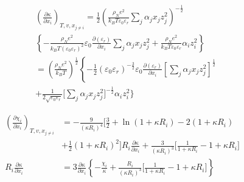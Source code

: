 \documentclass[12pt, letterpaper]{article}
\begin{document}
\begin{equation}
    \begin{aligned}
         & \left(\frac{\partial\kappa}{\partial x_{i}}\right)_{T,v,x_{j\neq i}}=\frac12\left(\frac{\rho_{N}e^{2}}{k_{B}T\varepsilon_{0}\varepsilon_{r}}\sum_{j}\alpha_{j}x_{j}z_{j}^{2}\right)^{-\frac12} \\&\left\{-\frac{\rho_{N}e^2}{k_{B}T\left(\varepsilon_{0}\varepsilon_{r}\right)^2}\varepsilon_{0}\frac{\partial\left(\varepsilon_{r}\right)}{\partial x_{i}}\sum_{j}\alpha_{j}x_{j}z_{j}^2+\frac{\rho_{N}e^2}{k_{B}T\varepsilon_{0}\varepsilon_{r}}\alpha_{i}z_{i}^2\right\}\\&=\left(\frac{\rho_{N}e^{2}}{k_{B}T}\right)^{\frac{1}{2}}\left\{-\frac{1}{2}\left(\varepsilon_{0}\varepsilon_{r}\right)^{-\frac{3}{2}}\varepsilon_{0}\frac{\partial\left(\varepsilon_{r}\right)}{\partial x_{i}}\left[\sum_{j}\alpha_{j}x_{j}z_{j}^{2}\right]^{\frac{1}{2}}\right.\\&+\frac{1}{2\sqrt{\varepsilon_{0}\varepsilon_{r}}}\Bigg[\sum_{j}\alpha_{j}x_{j}z_{j}^2\Bigg]^{-\frac{1}{2}}\alpha_{i}z_{i}^2\Bigg\}
    \end{aligned}
    \label{eq:dkappa_dh_dxi_bjerrum}
\end{equation}


\begin{equation}
    \begin{aligned}
        \left(\frac{\partial\chi_{i}}{\partial x_{i}}\right)_{T,v,x_{j\neq i}} & =-\frac{9}{\left(\kappa R_{i}\right)^{4}}\biggl[\frac{3}{2}+\ln(1+\kappa R_{i})-2(1+\kappa R_{i}) \\&+\frac{1}{2}\left(1+\kappa R_{i}\right)^{2}\bigg]R_{i}\frac{\partial\kappa}{\partial x_{i}}+\frac{3}{\left(\kappa R_{i}\right)^{3}}\bigg[\frac{1}{1+\kappa R_{i}}-1+\kappa R_{i}\bigg]\\R_{i}\frac{\partial\kappa}{\partial x_{i}}&= 3\frac{\partial\kappa}{\partial x_{i}}\left\{-\frac{\chi_{i}}{\kappa}+\frac{R_{i}}{\left(\kappa R_{i}\right)^{3}}\biggl[\frac{1}{1+\kappa R_{i}}-1+\kappa R_{i}\biggr]\right\}
    \end{aligned}
    \label{eq:dchi_dh_dxi_bjerrum}
\end{equation}
\end{document}
